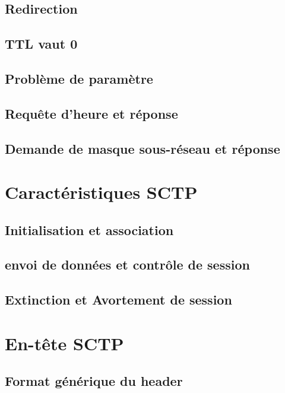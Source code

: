 \documentclass[a4paper,11pt]{report}
\begin{document}
\subsection{Redirection}

\subsection{TTL vaut 0}

\subsection{Problème de paramètre}

\subsection{Requête d'heure et réponse}

\subsection{Demande de masque sous-réseau et réponse}

%
\section{Caractéristiques SCTP}

\subsection{Initialisation et association}

\subsection{envoi de données et contrôle de session}

\subsection{Extinction et Avortement de session}

%
\section{En-tête SCTP}

\subsection{Format générique du header}
\end{document}
